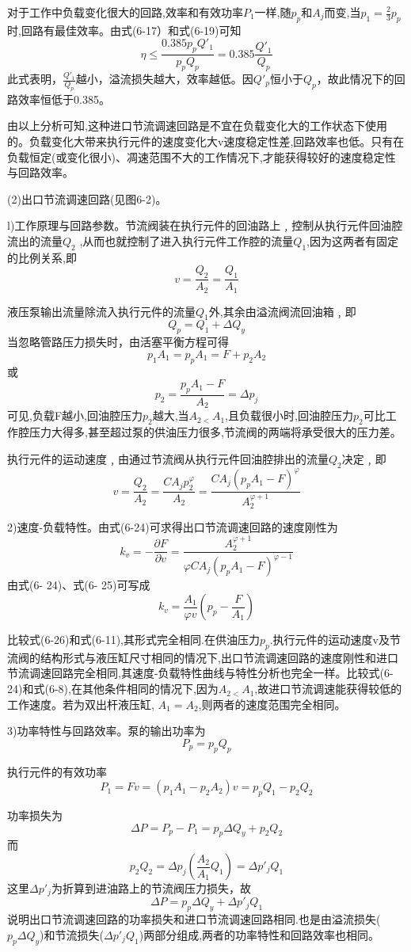 对于工作中负载变化很大的回路,效率和有效功率$P_1$一样,随$p_p$和$A_j$而变,当$p_1=\frac{2}{3}p_p$时,回路有最佳效率。由式(6-17）和式(6-19)可知
$$
\eta \le \frac{0.385p_pQ'_1}{p_pQ_p}=0.385\frac{Q'_1}{Q_p}
$$
此式表明，$\frac{Q'_1}{Q_p}$越小，溢流损失越大，效率越低。因$Q'_p$恒小于$Q_p$，故此情况下的回路效率恒低于0.385。

由以上分析可知,这种进口节流调速回路是不宜在负载变化大的工作状态下使用的。负载变化大带来执行元件的速度变化大v速度稳定性差,回路效率也低。只有在负载恒定(或变化很小)、凋速范围不大的工作情况下,才能获得较好的速度稳定性与回路效率。

(2)出口节流调速回路(见图6-2)。

l)工作原理与回路参数。节流阀装在执行元件的回油路上﹐控制从执行元件回油腔流出的流量$Q_2$ ,从而也就控制了进入执行元件工作腔的流量$Q_1$,因为这两者有固定的比例关系,即
$$
v=\frac{Q_2}{A_2}=\frac{Q_1}{A_1}
$$

液压泵输出流量除流入执行元件的流量$Q_1$外,其余由溢流阀流回油箱﹐即
$$
Q_p=Q_1+\varDelta Q_y
$$
当忽略管路压力损失时，由活塞平衡方程可得
$$
p_1A_1=p_pA_1=F+p_2A_2
$$
或
$$
p_2=\frac{p_pA_1-F}{A_2}=\varDelta p_j
$$
可见,负载F越小,回油腔压力$p_2$越大,当$A_{2<}A_1$,且负载很小时,回油腔压力$p_2$可比工作腔压力大得多,甚至超过泵的供油压力很多,节流阀的两端将承受很大的压力差。

执行元件的运动速度﹐由通过节流阀从执行元件回油腔排出的流量$Q_2$决定﹐即
$$
v=\frac{Q_2}{A_2}=\frac{CA_jp_{2}^{\varphi}}{A_2}=\frac{CA_j\left( p_pA_1-F \right) ^{\varphi}}{A_{2}^{\varphi +1}}
$$

2)速度-负载特性。由式(6-24)可求得出口节流调速回路的速度刚性为
$$
k_v=-\frac{\partial F}{\partial v}=\frac{A_{2}^{\varphi +1}}{\varphi CA_j\left( p_pA_1-F \right) ^{\varphi -1}}
$$
由式(6- 24)、式(6- 25)可写成
$$
k_v=\frac{A_1}{\varphi v}\left( p_p-\frac{F}{A_1} \right) 
$$

比较式(6-26)和式(6-11),其形式完全相同.在供油压力$p_p$.执行元件的运动速度v及节流阀的结构形式与液压缸尺寸相同的情况下,出口节流调速回路的速度刚性和进口节流调速回路完全相同,其速度-负载特性曲线与特性分析也完全一样。比较式(6-24)和式(6-8),在其他条件相同的情况下,因为$A_{2<}A_1$,故进口节流调速能获得较低的工作速度。若为双出杆液压缸, $A_1=A_2$,则两者的速度范围完全相同。

3)功率特性与回路效率。泵的输出功率为
$$
P_p=p_pQ_p
$$

执行元件的有效功率
$$
P_1=Fv=\left( p_1A_1-p_2A_2 \right) v=p_pQ_1-p_2Q_2
$$

功率损失为
$$
\varDelta P=P_p-P_1=p_p\varDelta Q_y+p_2Q_2
$$
而$$
p_2Q_2=\varDelta p_j\left( \frac{A_2}{A_1}Q_1 \right) =\varDelta p'_jQ_1
$$
这里$\varDelta p'_j$为折算到进油路上的节流阀压力损失，故
$$
\varDelta P=p_p\varDelta Q_y+\varDelta p'_jQ_1
$$
说明出口节流调速回路的功率损失和进口节流调速回路相同.也是由溢流损失($p_p\varDelta Q_y$)和节流损失($\varDelta p'_jQ_1$)两部分组成,两者的功率特性和回路效率也相同。

